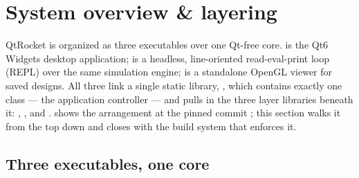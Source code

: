 \section{System overview \& layering}\label{sec:overview}

QtRocket is organized as three executables over one Qt-free core.  is the
Qt6 Widgets desktop application;  is a headless, line-oriented
read-eval-print loop (REPL) over the same simulation engine;  is
a standalone OpenGL viewer for saved designs. All three link a single static library,
, which contains exactly one class --- the 
application controller  --- and pulls in the three layer
libraries beneath it: , , and 
.  shows the arrangement at the
pinned commit ; this section walks it from the top down and closes with the
build system that enforces it.


\subsection{Three executables, one core}\label{sec:overview-executables}


